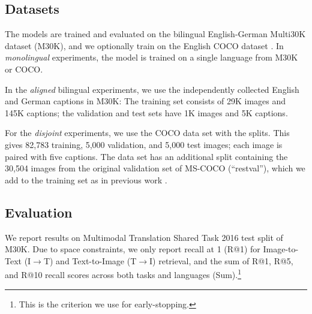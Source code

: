 \subsection{Datasets}

The models are trained and evaluated on the bilingual English-German Multi30K dataset (M30K), and we
optionally train on the English COCO dataset 
\citep{DBLP:journals/corr/ChenFLVGDZ15}. In \textit{monolingual} 
experiments, the model is trained on a single language from M30K or 
COCO.

In the \emph{aligned} bilingual experiments, we use the
independently collected English and German captions in M30K:
The training set consists of 29K images and 145K captions; the validation and test sets have 1K images and 5K captions. 

For the \emph{disjoint} experiments, we use the COCO data set
with the \cite{karpathy2015deep} splits. This gives 82,783 training,
5,000 validation, and 5,000 test images; each image is paired with five captions.
The data set has an additional split containing the  
30,504 images from the original validation set of 
MS-COCO (``restval''),
 which we add to the training set as in previous work \citep{karpathy2015deep,vendrov2016order,faghri2017vse++}.
 


\subsection{Evaluation}
We report results on Multimodal Translation Shared Task 2016 test split \citep{specia2016shared} of M30K. 
Due to space constraints, we only report recall at 1 (R@1) for 
Image-to-Text (I$\rightarrow$T) and Text-to-Image (T$\rightarrow$I)
retrieval, and the sum of R@1, R@5, and R@10 recall scores across both tasks and languages (Sum).\footnote{This is the criterion we use
for early-stopping.}

